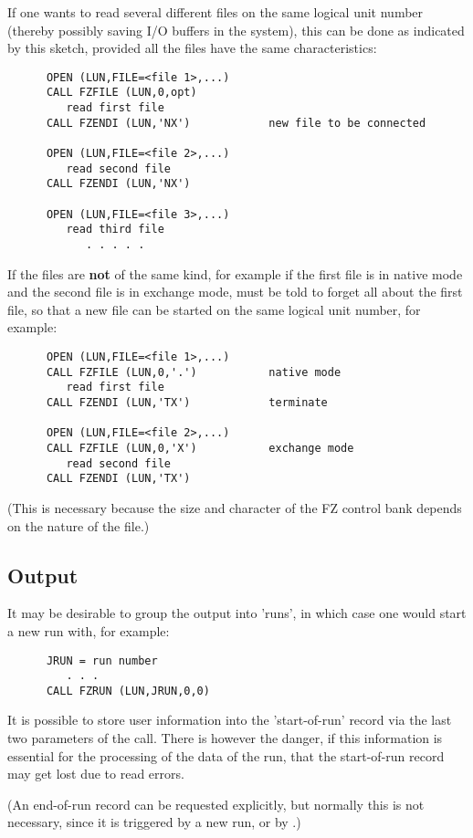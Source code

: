 If one wants to read several different files on the same
logical unit number (thereby possibly saving I/O buffers
in the system), this can be done as indicated by this sketch,
provided all the files have the same characteristics:
\begin{verbatim}
      OPEN (LUN,FILE=<file 1>,...)
      CALL FZFILE (LUN,0,opt)
         read first file
      CALL FZENDI (LUN,'NX')            new file to be connected

      OPEN (LUN,FILE=<file 2>,...)
         read second file
      CALL FZENDI (LUN,'NX')

      OPEN (LUN,FILE=<file 3>,...)
         read third file
            . . . . .
\end{verbatim}
If the files are \textbf{not} of the same kind,
for example if the first file is in native mode
and the second file is in exchange mode,
 must be told to forget all about the first file,
so that a new file can be started on the same
logical unit number, for example:
\begin{verbatim}
      OPEN (LUN,FILE=<file 1>,...)
      CALL FZFILE (LUN,0,'.')           native mode
         read first file
      CALL FZENDI (LUN,'TX')            terminate

      OPEN (LUN,FILE=<file 2>,...)
      CALL FZFILE (LUN,0,'X')           exchange mode
         read second file
      CALL FZENDI (LUN,'TX')
\end{verbatim}
(This is necessary because the size and character
of the FZ control bank depends on the nature of the file.)

\subsection*{Output}

It may be desirable to group the output into 'runs',
in which case one would start a new run with, for example:
\begin{verbatim}
      JRUN = run number
         . . .
      CALL FZRUN (LUN,JRUN,0,0)
\end{verbatim}
It is possible to store user information into the 'start-of-run'
record via the last two parameters of the call.
There is however the danger,
if this information is essential for the processing of the
data of the run,
that the start-of-run record may get lost due to read errors.

(An end-of-run record can be requested explicitly,
but normally this is not necessary, since it is triggered
by a new run, or by .)

